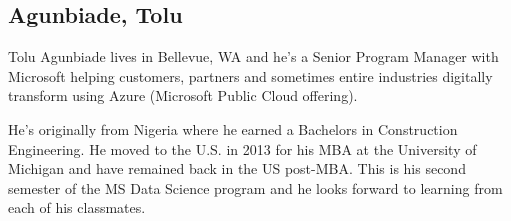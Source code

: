 
\subsection{Agunbiade, Tolu}

Tolu Agunbiade lives in Bellevue, WA and he's a Senior Program Manager with Microsoft helping customers, 
partners and sometimes entire industries digitally transform using Azure (Microsoft Public Cloud offering).

He's originally from Nigeria where he earned a Bachelors in Construction Engineering. He moved to the U.S. 
in 2013 for his MBA at the University of Michigan and have remained back in the US post-MBA. 
This is his second semester of the MS Data Science program and he looks forward to learning from each 
of his classmates.
